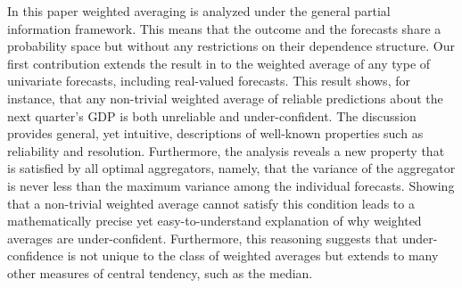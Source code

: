 \documentclass[11pt]{article}
\theoremstyle{definition}
\theoremstyle{definition}
\begin{document}
In this paper weighted averaging is analyzed under the general partial information framework. This means that the outcome and the forecasts share a probability space but without any restrictions on their dependence structure. Our first contribution extends the result
in \cite{Ranjan08} to the weighted average of any type of univariate
forecasts, including real-valued forecasts.
This result shows, for instance, that any non-trivial
weighted average of reliable predictions about the next quarter's GDP
is both unreliable and under-confident. The discussion
provides general, yet intuitive, descriptions of well-known properties
such as reliability and resolution. Furthermore, the analysis reveals a new property
that is satisfied by all optimal aggregators, namely, that the variance of
the aggregator is
never less than the maximum variance among the individual
forecasts. Showing that a non-trivial weighted average cannot satisfy
this condition leads to a mathematically precise yet
easy-to-understand explanation of why weighted averages are
under-confident.  Furthermore, this reasoning suggests that
under-confidence is not unique to the class of weighted averages but
extends to many other measures of central tendency, such as the
median.
\end{document}
